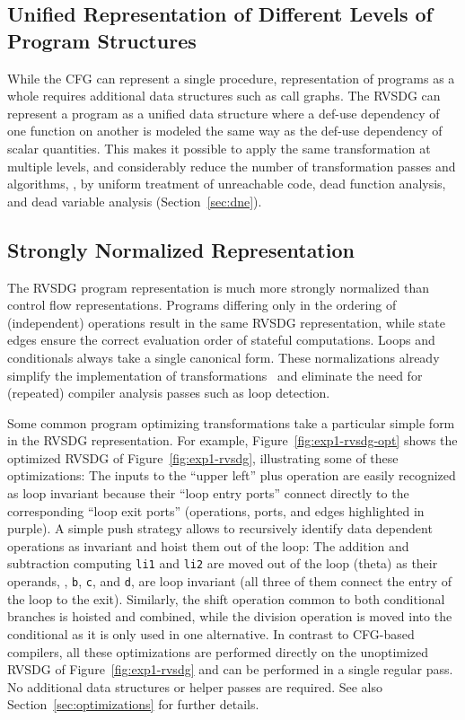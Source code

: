 \subsection{Unified Representation of Different Levels of Program Structures}

While the CFG can represent %
a single procedure, representation of programs as a whole requires additional
data structures such as call graphs. %
The RVSDG can represent a program as a unified data structure where a def-use
dependency of one function on another is modeled the same way as the def-use
dependency of scalar quantities. %
This makes it possible to apply the same transformation at multiple levels,
and considerably reduce the number of transformation passes and
algorithms, \eg, by uniform treatment of unreachable code, dead function analysis,
 and dead variable analysis (Section~\ref{sec:dne}).

\subsection{Strongly Normalized Representation}

The RVSDG program representation is much more strongly normalized than control flow
representations. %
Programs differing only in the ordering of (independent) operations result in
the same RVSDG representation, while state edges ensure the correct evaluation order
of stateful computations. Loops and conditionals always take a single
canonical form. %
These normalizations already simplify the implementation of
transformations~\cite{Weise94,Johnson04,Lawrence07} and eliminate the need for (repeated)
compiler analysis passes such as loop detection. %

Some common program optimizing transformations take a particular simple form in
the RVSDG representation. %
For example, Figure~\ref{fig:exp1-rvsdg-opt} shows the optimized RVSDG of
Figure~\ref{fig:exp1-rvsdg}, illustrating some of these optimizations: %
The inputs to the ``upper left'' plus operation are easily recognized as loop
invariant because their ``loop entry ports'' connect directly to the
corresponding ``loop exit ports'' (operations, ports, and edges highlighted in
purple). %
A simple push strategy allows to recursively identify data dependent operations
as invariant and hoist them out of the loop: %
The addition and subtraction computing \verb;li1; and \verb;li2; are moved out
of the loop (theta) as their operands, \ie, \verb;b;, \verb;c;, and \verb;d;, are
loop invariant (all three of them connect the entry of the loop to the exit). %
Similarly, the shift operation common to both conditional branches is hoisted
and combined, while the division operation is moved into the conditional as it
is only used in one alternative. %
In contrast to CFG-based compilers, all these optimizations are performed
directly on the unoptimized RVSDG of Figure~\ref{fig:exp1-rvsdg} and can be
performed in a single regular pass. %
No additional data structures or helper passes are required. %
See also Section~\ref{sec:optimizations} for further details. %

